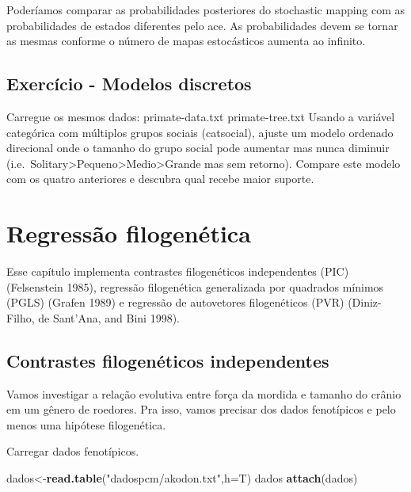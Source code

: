 \documentclass[
]{book}
\newenvironment{Shaded}{\begin{snugshade}}{\end{snugshade}}
\newcommand{\AttributeTok}[1]{\textcolor[rgb]{0.13,0.29,0.53}{#1}}
\newcommand{\FunctionTok}[1]{\textcolor[rgb]{0.13,0.29,0.53}{\textbf{#1}}}
\newcommand{\NormalTok}[1]{#1}
\newcommand{\OtherTok}[1]{\textcolor[rgb]{0.56,0.35,0.01}{#1}}
\newcommand{\StringTok}[1]{\textcolor[rgb]{0.31,0.60,0.02}{#1}}
\begin{document}
Poderíamos comparar as probabilidades posteriores do stochastic mapping com as probabilidades de estados diferentes pelo ace. As probabilidades devem se tornar as mesmas conforme o número de mapas estocásticos aumenta ao infinito.

\section{Exercício - Modelos discretos}\label{exercuxedcio---modelos-discretos}

Carregue os mesmos dados:
primate-data.txt
primate-tree.txt
Usando a variável categórica com múltiplos grupos sociais (catsocial), ajuste um modelo ordenado direcional onde o tamanho do grupo social pode aumentar mas nunca diminuir (i.e.~Solitary\textgreater Pequeno\textgreater Medio\textgreater Grande mas sem retorno). Compare este modelo com os quatro anteriores e descubra qual recebe maior suporte.

\chapter{Regressão filogenética}\label{regressuxe3o-filogenuxe9tica}

Esse capítulo implementa contrastes filogenéticos independentes (PIC) (Felsenstein 1985), regressão filogenética generalizada por quadrados mínimos (PGLS) (Grafen 1989) e regressão de autovetores filogenéticos (PVR) (Diniz-Filho, de Sant'Ana, and Bini 1998).

\section{Contrastes filogenéticos independentes}\label{contrastes-filogenuxe9ticos-independentes-1}

Vamos investigar a relação evolutiva entre força da mordida e tamanho do crânio em um gênero de roedores. Pra isso, vamos precisar dos dados fenotípicos e pelo menos uma hipótese filogenética.

Carregar dados fenotípicos.

\begin{Shaded}
\begin{Highlighting}[]
\NormalTok{dados}\OtherTok{\textless{}{-}}\FunctionTok{read.table}\NormalTok{(}\StringTok{"dadospcm/akodon.txt"}\NormalTok{,}\AttributeTok{h=}\NormalTok{T)}
\NormalTok{dados}
\FunctionTok{attach}\NormalTok{(dados)}
\end{Highlighting}
\end{Shaded}
\end{document}
